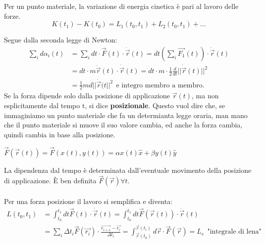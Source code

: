 \begin{theorem}
    Per un punto materiale, la variazione di energia cinetica è pari al lavoro delle forze.
    $$K(t_1) - K(t_0) = L_1(t_0, t_1) + L_2(t_0, t_1) + \dots$$
\end{theorem}
\hspace{-15pt}Segue dalla seconda legge di Newton:
\begin{equation*}
    \begin{split}
        \sum_{i} d\alpha_i(t) & = \sum_i dt \cdot \vec{F}(t) \cdot \dot{\vec{r}}(t) = dt (\sum_i \vec{F_1}(t)) \cdot \dot{\vec{r}}(t)\\
                              & = dt \cdot m \ddot{\vec{r}}(t) \cdot \dot{\vec{r}}(t) = dt \cdot m \cdot \frac{1}{2}\frac{d}{dt}||\dot{\vec{r}}(t)||^2\\
                              & = \frac{1}{2}md||\dot{\vec{r}}(t||^2 \:\: \text{e integro membro a membro.}
    \end{split}
\end{equation*}
Se la forza dipende solo dalla posizione di applicazione $\vec{r}(t)$, ma non esplicitamente dal tempo t, si dice \textbf{posizionale}. Questo vuol
dire che, se immaginiamo un punto materiale che fa un determianta legge oraria, man mano che il punto materiale si muove il suo valore cambia, ed anche la forza 
cambia, quindi cambia in base alla posizione.
\begin{example}
    $\vec{F}(\vec{r}(t)) = \vec{F}(x(t), y(t)) = \alpha x(t) \hat{x} + \beta y(t) \hat{y}$
\end{example}
\hspace{-15pt}La dipendenza dal tempo è determinata dall'eventuale movimento della posizione di applicazione. È 
ben definita $\vec{F}(\vec{r}) \forall t$.\\\\
Per una forza posizione il lavoro si semplifica e diventa:
\begin{equation*}
    \begin{split}
        L(t_0, t_1) & = \int_{t_0}^{t_1}dt \vec{F}(t) \cdot \dot{\vec{r}}(t) = \int_{t_0}^{t_1}dt \vec{F}(\vec{r}(t)) \cdot \dot{\vec{r}}(t) \\
                    & = \sum_i \Delta t_i \vec{F}(\vec{r_i}) \cdot \frac{\vec{r_{i+1}} - \vec{r_i}}{\Delta t_i} = \int_{\vec{r}(t_0 )}^{\vec{r}(t_i)} d\vec{r}\cdot \vec{F}(\vec{r}) = L_e \:\:\text{"integrale di lena"}
    \end{split}
\end{equation*}
